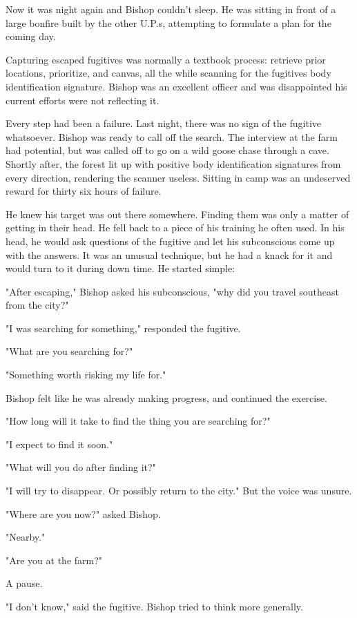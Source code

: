 \documentclass[courier]{sffms}
\begin{document}
Now it was night again and Bishop couldn't sleep.
He was sitting in front of
a large bonfire built by the other U.P.s, attempting
to formulate a plan for the coming day.

Capturing escaped fugitives was normally a textbook
process: retrieve prior locations, prioritize, and
canvas, all the while scanning for the fugitives 
body identification signature. Bishop was an
excellent officer and was disappointed his current
efforts were not reflecting it.

Every step had been a failure. Last night, there was
no sign of the fugitive whatsoever. Bishop was ready
to call off the search. The interview at the farm had
potential, but was called off to go on a wild goose 
chase through a cave. Shortly after, the forest lit up
with positive body identification signatures from every
direction, rendering the scanner useless.
Sitting in camp was an undeserved reward for thirty
six hours of failure.

He knew his target was out there somewhere. Finding
them was only a matter of getting in their head. He
fell back to a piece of his training he often used. 
In his head, he would ask questions 
of the fugitive and let his subconscious come
up with the answers. It was an unusual technique,
but he had a knack for it and would turn to it
during down time. He started simple:

"After escaping," Bishop asked his subconscious, 
"why did you travel southeast
from the city?"

"I was searching for something," responded the
fugitive.

"What are you searching for?"

"Something worth risking my life for."

Bishop felt like he was already making progress,
and continued the exercise.

"How long will it take to find the thing you are
searching for?"

"I expect to find it soon."

"What will you do after finding it?"

"I will try to disappear. Or possibly return to
the city." But the voice was unsure.

"Where are you now?" asked Bishop.

"Nearby."

"Are you at the farm?"

A pause.

"I don't know," said the fugitive.
Bishop tried to think more generally.
\end{document}
